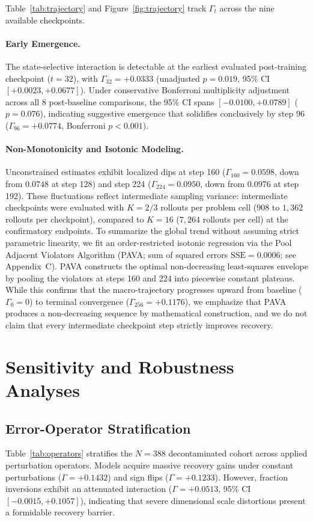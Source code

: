 \documentclass{article}
\begin{document}
Table~\ref{tab:trajectory} and Figure~\ref{fig:trajectory} track $\Gamma_t$ across the nine available checkpoints.

\paragraph{Early Emergence.}
The state-selective interaction is detectable at the earliest evaluated post-training checkpoint ($t=32$), with $\Gamma_{32} = +0.0333$ (unadjusted $p=0.019$, 95\% CI $[+0.0023, +0.0677]$). Under conservative Bonferroni multiplicity adjustment across all 8 post-baseline comparisons, the 95\% CI spans $[-0.0100, +0.0789]$ ($p=0.076$), indicating suggestive emergence that solidifies conclusively by step 96 ($\Gamma_{96} = +0.0774$, Bonferroni $p < 0.001$).

\paragraph{Non-Monotonicity and Isotonic Modeling.}
Unconstrained estimates exhibit localized dips at step 160 ($\Gamma_{160}=0.0598$, down from $0.0748$ at step 128) and step 224 ($\Gamma_{224}=0.0950$, down from $0.0976$ at step 192). These fluctuations reflect intermediate sampling variance: intermediate checkpoints were evaluated with $K=2/3$ rollouts per problem cell ($908$ to $1,362$ rollouts per checkpoint), compared to $K=16$ ($7,264$ rollouts per cell) at the confirmatory endpoints. To summarize the global trend without assuming strict parametric linearity, we fit an order-restricted isotonic regression via the Pool Adjacent Violators Algorithm (PAVA; sum of squared errors $\text{SSE} = 0.0006$; see Appendix~C). PAVA constructs the optimal non-decreasing least-squares envelope by pooling the violators at steps 160 and 224 into piecewise constant plateaus. While this confirms that the macro-trajectory progresses upward from baseline ($\Gamma_0 = 0$) to terminal convergence ($\Gamma_{256} = +0.1176$), we emphasize that PAVA produces a non-decreasing sequence by mathematical construction, and we do not claim that every intermediate checkpoint step strictly improves recovery.

\section{Sensitivity and Robustness Analyses}

\subsection{Error-Operator Stratification}

Table~\ref{tab:operators} stratifies the $N=388$ decontaminated cohort across applied perturbation operators. Models acquire massive recovery gains under constant perturbations ($\Gamma = +0.1432$) and sign flips ($\Gamma = +0.1233$). However, fraction inversions exhibit an attenuated interaction ($\Gamma = +0.0513$, 95\% CI $[-0.0015, +0.1057]$), indicating that severe dimensional scale distortions present a formidable recovery barrier.
\end{document}
